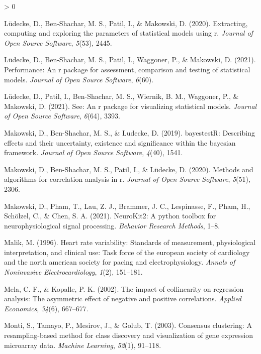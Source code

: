 \documentclass[
  english,
  jou,floatsintext]{apa6}
\newlength{\cslhangindent}
\newenvironment{CSLReferences}[2] %
 {%
  \setlength{\parindent}{0pt}
  \ifodd #1 \everypar{\setlength{\hangindent}{\cslhangindent}}\ignorespaces\fi
  \ifnum #2 > 0
  \setlength{\parskip}{#2\baselineskip}
  \fi
 }%
 {}
\begin{document}
\begin{CSLReferences}{1}{0}
\leavevmode\hypertarget{ref-ludecke2020extracting}{}%
Lüdecke, D., Ben-Shachar, M. S., Patil, I., \& Makowski, D. (2020). Extracting, computing and exploring the parameters of statistical models using r. \emph{Journal of Open Source Software}, \emph{5}(53), 2445.

\leavevmode\hypertarget{ref-ludecke2021performance}{}%
Lüdecke, D., Ben-Shachar, M. S., Patil, I., Waggoner, P., \& Makowski, D. (2021). Performance: An r package for assessment, comparison and testing of statistical models. \emph{Journal of Open Source Software}, \emph{6}(60).

\leavevmode\hypertarget{ref-ludecke2021see}{}%
Lüdecke, D., Patil, I., Ben-Shachar, M. S., Wiernik, B. M., Waggoner, P., \& Makowski, D. (2021). See: An r package for visualizing statistical models. \emph{Journal of Open Source Software}, \emph{6}(64), 3393.

\leavevmode\hypertarget{ref-makowski2019bayestestr}{}%
Makowski, D., Ben-Shachar, M. S., \& Ludecke, D. (2019). bayestestR: Describing effects and their uncertainty, existence and significance within the bayesian framework. \emph{Journal of Open Source Software}, \emph{4}(40), 1541.

\leavevmode\hypertarget{ref-makowski2020methods}{}%
Makowski, D., Ben-Shachar, M. S., Patil, I., \& Lüdecke, D. (2020). Methods and algorithms for correlation analysis in r. \emph{Journal of Open Source Software}, \emph{5}(51), 2306.

\leavevmode\hypertarget{ref-makowski2021neurokit2}{}%
Makowski, D., Pham, T., Lau, Z. J., Brammer, J. C., Lespinasse, F., Pham, H., Schölzel, C., \& Chen, S. A. (2021). NeuroKit2: A python toolbox for neurophysiological signal processing. \emph{Behavior Research Methods}, 1--8.

\leavevmode\hypertarget{ref-malik1996heart}{}%
Malik, M. (1996). Heart rate variability: Standards of measurement, physiological interpretation, and clinical use: Task force of the european society of cardiology and the north american society for pacing and electrophysiology. \emph{Annals of Noninvasive Electrocardiology}, \emph{1}(2), 151--181.

\leavevmode\hypertarget{ref-mela2002impact}{}%
Mela, C. F., \& Kopalle, P. K. (2002). The impact of collinearity on regression analysis: The asymmetric effect of negative and positive correlations. \emph{Applied Economics}, \emph{34}(6), 667--677.

\leavevmode\hypertarget{ref-monti2003consensus}{}%
Monti, S., Tamayo, P., Mesirov, J., \& Golub, T. (2003). Consensus clustering: A resampling-based method for class discovery and visualization of gene expression microarray data. \emph{Machine Learning}, \emph{52}(1), 91--118.


\end{CSLReferences}
\end{document}
